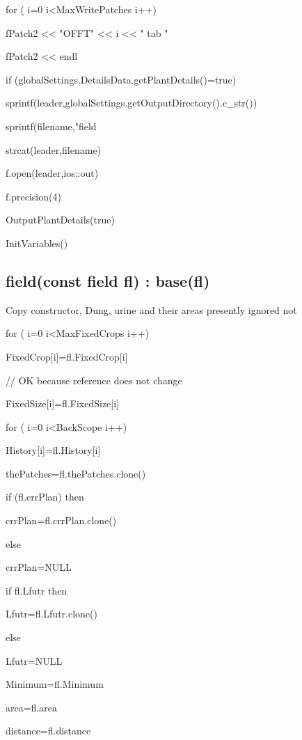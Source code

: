 \documentclass[%
]{scrartcl}
\begin{document}
    
      \quad for ( i=0 i<MaxWritePatches i++)
   
        \quad \quad  fPatch2 << "OFFT" << i << " tab "
  
      \quad fPatch2 << endl
   

   if (globalSettings.DetailsData.getPlantDetails()=true)
   
       \quad sprintf(leader,globalSettings.getOutputDirectory().c\_str())
     
      \quad sprintf(filename,"field%

     \quad  strcat(leader,filename)

     \quad  f.open(leader,ios::out)
     
     \quad  f.precision(4)
     
	 \quad	OutputPlantDetails(true)
   
   
   InitVariables()





\subsection{field(const field fl) : base(fl)}
Copy constructor, Dung, urine and their areas presently ignored not 

   for ( i=0 i<MaxFixedCrops i++)
   
  \quad    FixedCrop[i]=fl.FixedCrop[i] 
  
   // OK because reference does not change
  
  \quad    FixedSize[i]=fl.FixedSize[i]
 
   for ( i=0 i<BackScope i++)
   
	\quad   History[i]=fl.History[i]
	   
   thePatches=fl.thePatches.clone()
   
   if (fl.crrPlan) then
   
  	 \quad	   crrPlan=fl.crrPlan.clone()
  
   else
   
     \quad	  crrPlan=NULL
 
   if fl.Lfutr then
   
    \quad	   Lfutr=fl.Lfutr.clone()
  
   else
   
    \quad	   Lfutr=NULL
      
   Minimum=fl.Minimum
   
   area=fl.area

   distance=fl.distance
\end{document}
